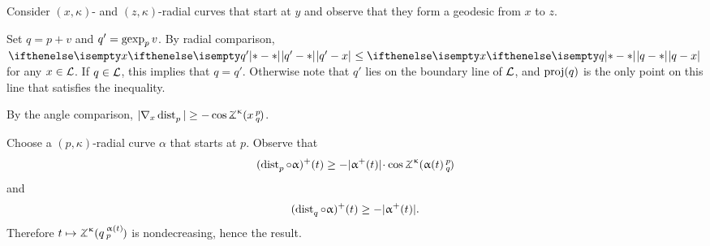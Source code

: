 Consider $(x,\kappa)$- and $(z,\kappa)$-radial curves that start at $y$
and observe that they form a geodesic from $x$ to $z$.

 Set $q=p+v$ and $q'=\mathop{\rm gexp}\nolimits_pv$. 
By radial comparison, $\dist{q'}{x}{}\le \dist{q}{x}{}$ for any $x\in \spc{L}$.
If $q\in \spc{L}$, this implies that $q=q'$.
Otherwise note that $q'$ lies on the boundary line of $\mathcal{L}$, and $\mathop{\rm proj}\nolimits(q)$ is the only point on this line that satisfies the inequality.

By the angle comparison,
$|\nabla_x\distfun p|\ge-\cos \angk\kappa xpq$.

Choose a $(p,\kappa)$-radial curve $\alpha$ that starts at $p$.
Observe that 
\[(\distfun p\circ \alpha)^+(t)\ge-|\alpha^+(t)|\cdot \cos \angk\kappa {\alpha(t)}p q\]
and
\[(\distfun q\circ\alpha)^+(t)\ge -|\alpha^+(t)|.\]
Therefore $t\mapsto\angk\kappa q{\alpha(t)}p$  is nondecreasing, hence the result.



